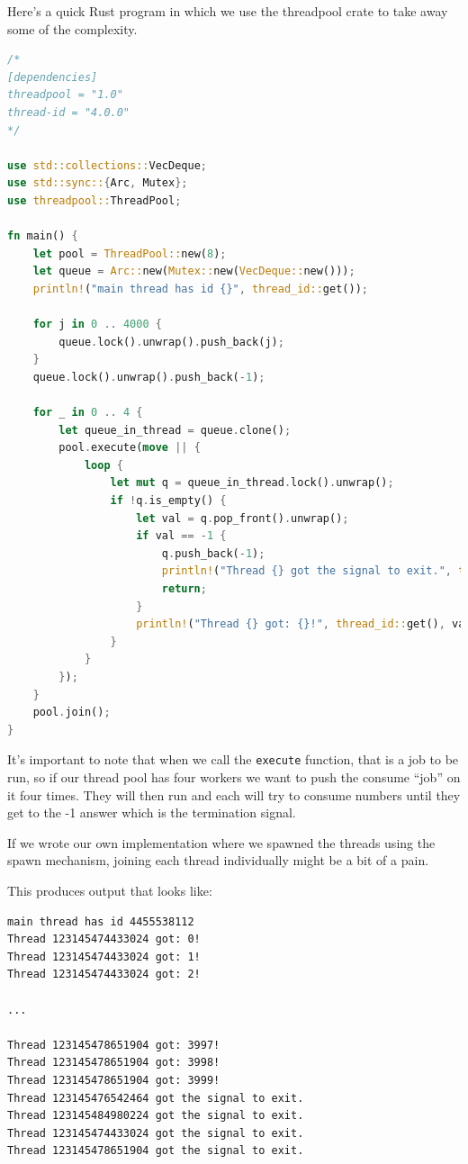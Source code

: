 Here's a quick Rust program in which we use the threadpool crate to take away some of the complexity.
\begin{lstlisting}[language=Rust]
/*
[dependencies]
threadpool = "1.0"
thread-id = "4.0.0"
*/

use std::collections::VecDeque;
use std::sync::{Arc, Mutex};
use threadpool::ThreadPool;

fn main() {
    let pool = ThreadPool::new(8);
    let queue = Arc::new(Mutex::new(VecDeque::new()));
    println!("main thread has id {}", thread_id::get());

    for j in 0 .. 4000 {
        queue.lock().unwrap().push_back(j);
    }
    queue.lock().unwrap().push_back(-1);

    for _ in 0 .. 4 {
        let queue_in_thread = queue.clone();
        pool.execute(move || {
            loop {
                let mut q = queue_in_thread.lock().unwrap();
                if !q.is_empty() {
                    let val = q.pop_front().unwrap();
                    if val == -1 {
                        q.push_back(-1);
                        println!("Thread {} got the signal to exit.", thread_id::get());
                        return;
                    }
                    println!("Thread {} got: {}!", thread_id::get(), val);
                }
            }
        });
    }
    pool.join();
}
\end{lstlisting}

It's important to note that when we call the \texttt{execute} function, that is a job to be run, so if our thread pool has four workers we want to push the consume ``job'' on it four times. They will then run and each will try to consume numbers until they get to the -1 answer which is the termination signal.

If we wrote our own implementation where we spawned the threads using the spawn mechanism, joining each thread individually might be a bit of a pain. 

This produces output that looks like:

\begin{verbatim}
main thread has id 4455538112
Thread 123145474433024 got: 0!
Thread 123145474433024 got: 1!
Thread 123145474433024 got: 2!

...

Thread 123145478651904 got: 3997!
Thread 123145478651904 got: 3998!
Thread 123145478651904 got: 3999!
Thread 123145476542464 got the signal to exit.
Thread 123145484980224 got the signal to exit.
Thread 123145474433024 got the signal to exit.
Thread 123145478651904 got the signal to exit.
\end{verbatim}






